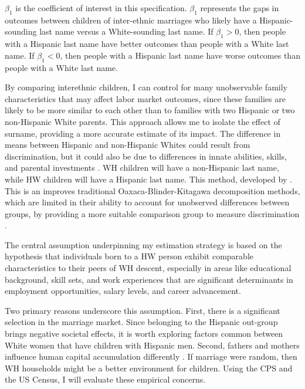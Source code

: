 $\beta_{1}$ is the coefficient of interest in this specification. $\beta_{1}$ represents the gaps in outcomes between children of inter-ethnic marriages who likely have a Hispanic-sounding last name versus a White-sounding last name. If $\beta_{1} > 0$, then people with a Hispanic last name have better outcomes than people with a White last name. If $\beta_{1} < 0$, then people with a Hispanic last name have worse outcomes than people with a White last name.

By comparing interethnic children, I can control for many unobservable family characteristics that may affect labor market outcomes, since these families are likely to be more similar to each other than to families with two Hispanic or two non-Hispanic White parents. This approach allows me to isolate the effect of surname, providing a more accurate estimate of its impact. The difference in means between Hispanic and non-Hispanic Whites could result from discrimination, but it could also be due to differences in innate abilities, skills, and parental investments . WH children will have a non-Hispanic last name, while HW children will have a Hispanic last name. This method, developed by \textcite{rubinstein2014pride}. This is an improves traditional Oaxaca-Blinder-Kitagawa decomposition methods, which are limited in their ability to account for unobserved differences between groups, by providing a more suitable comparison group to measure discrimination \autocite{oaxaca1973male,blinder1973wage,kitagawa1955components}.

The central assumption underpinning my estimation strategy is based on the hypothesis that individuals born to a HW person exhibit comparable characteristics to their peers of WH descent, especially in areas like educational background, skill sets, and work experiences that are significant determinants in employment opportunities, salary levels, and career advancement.

Two primary reasons underscore this assumption. First, there is a significant selection in the marriage market. Since belonging to the Hispanic out-group brings negative societal effects, it is worth exploring factors common between White women that have children with Hispanic men. Second, fathers and mothers influence human capital accumulation differently \autocite{kimball2009risk,magruder2010intergenerational}. If marriage were random, then WH households might be a better environment for children. Using the CPS and the US Census, I will evaluate these empirical concerns.

